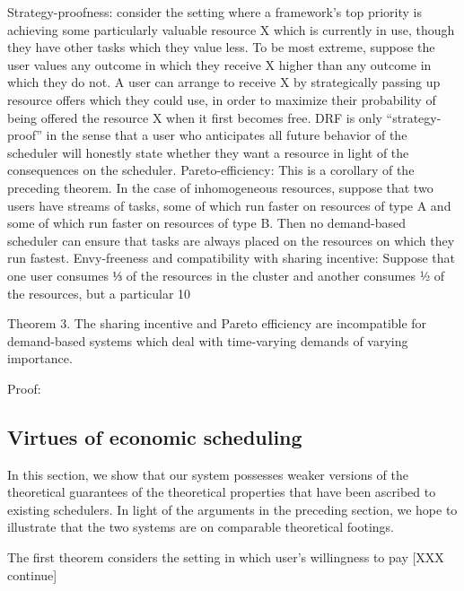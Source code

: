 \documentclass{acm_proc_article-sp}
\begin{document}
Strategy-proofness: consider the setting where a framework’s top priority is achieving some particularly valuable resource X which is currently in use, though they have other tasks which they value less. To be most extreme, suppose the user values any outcome in which they receive X higher than any outcome in which they do not. A user can arrange to receive X by strategically passing up resource offers which they could use, in order to maximize their probability of being offered the resource X when it first becomes free. DRF is only “strategy-proof” in the sense that a user who anticipates all future behavior of the scheduler will honestly state whether they want a resource in light of the consequences on the scheduler. 
Pareto-efficiency: This is a corollary of the preceding theorem. In the case of inhomogeneous resources, suppose that two users have streams of tasks, some of which run faster on resources of type A and some of which run faster on resources of type B. Then no demand-based scheduler can ensure that tasks are always placed on the resources on which they run fastest.
Envy-freeness and compatibility with sharing incentive: Suppose that one user consumes ⅓ of the resources in the cluster and another consumes ½ of the resources, but a particular 10%

Theorem 3. The sharing incentive and Pareto efficiency are incompatible for demand-based systems which deal with time-varying demands of varying importance.

Proof: %
\subsection{Virtues of economic scheduling}
In this section, we show that our system possesses weaker versions of the theoretical guarantees of the theoretical properties that have been ascribed to existing schedulers. In light of the arguments in the preceding section, we hope to illustrate that the two systems are on comparable theoretical footings.

The first theorem considers the setting in which user’s willingness to pay [XXX continue]
\end{document}
